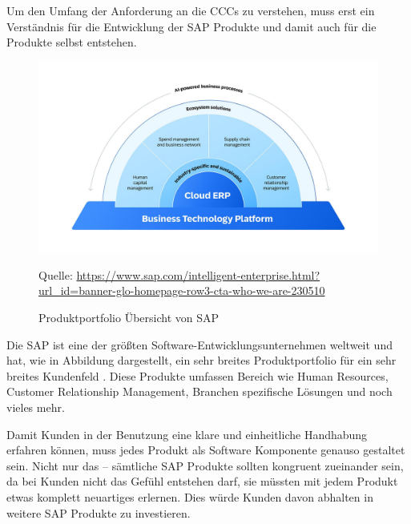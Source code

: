 \documentclass[../main.tex]{subfiles}
\begin{document}
Um den Umfang der Anforderung an die \glspl{CCC} zu verstehen, muss erst ein Verständnis für die Entwicklung der SAP Produkte und damit auch für die Produkte selbst entstehen.

\begin{figure}[ht]
    \centering
    \includegraphics[scale=.21]{"bilder/produktportfolio.jpg"}
    \caption{Produktportfolio Übersicht von SAP}
    \footnotesize Quelle: \url{https://www.sap.com/intelligent-enterprise.html?url_id=banner-glo-homepage-row3-cta-who-we-are-230510}
    \label{fig:produktportfolio}
\end{figure}

Die SAP ist eine der größten Software-Entwicklungsunternehmen weltweit und hat, wie in Abbildung  dargestellt, ein sehr breites Produktportfolio für ein sehr breites Kundenfeld  \cite{CorporateFactSheet}.
Diese Produkte umfassen Bereich wie Human Resources, Customer Relationship Management, Branchen spezifische Lösungen und noch vieles mehr.

Damit Kunden in der Benutzung eine klare und einheitliche Handhabung erfahren können, muss jedes Produkt als Software Komponente genauso gestaltet sein.
Nicht nur das -- sämtliche SAP Produkte sollten kongruent zueinander sein, da bei Kunden nicht das Gefühl entstehen darf, sie müssten mit jedem Produkt etwas komplett neuartiges erlernen.
Dies würde Kunden davon abhalten in weitere SAP Produkte zu investieren.
\cite{Hier ne passende quelle waere cool}
\end{document}
